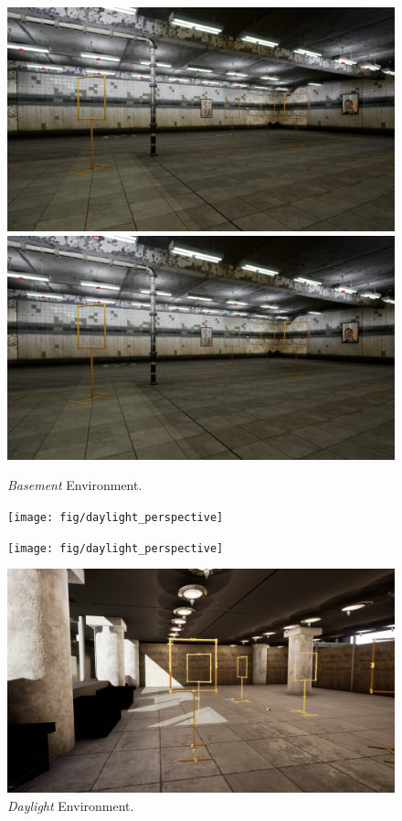 \begin{figure}[hbtp]
	\centering
	\begin{minipage}{0.49\textwidth}
		\includegraphics[width=\textwidth]{fig/basement_perspective}
	\end{minipage}
	\begin{minipage}{0.49\textwidth}
	\includegraphics[width=\textwidth]{fig/basement_perspective}
\end{minipage}
\caption{\textit{Basement} Environment.}
\begin{minipage}{0.49\textwidth}
	\texttt{[image: fig/daylight\_perspective]}
\end{minipage}
\begin{minipage}{0.49\textwidth}
	\texttt{[image: fig/daylight\_perspective]}
\end{minipage}
\caption{\textit{Daylight} Environment.}
\begin{minipage}{0.49\textwidth}
	\includegraphics[width=\textwidth]{fig/iros_perspective}

\end{minipage}
\end{figure}
